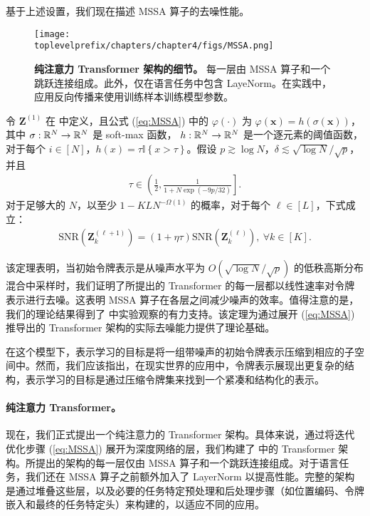 \documentclass[../../book-main_zh.tex]{subfiles}
\begin{document}
基于上述设置，我们现在描述 MSSA 算子的去噪性能。

\begin{figure*}[t]
\begin{center}
        \texttt{[image: \\toplevelprefix/chapters/chapter4/figs/MSSA.png]}
    \caption{\textbf{纯注意力 Transformer 架构的细节。} 每一层由 MSSA 算子和一个跳跃连接组成。此外，仅在语言任务中包含 LayeNorm。在实践中，应用反向传播来使用训练样本训练模型参数。 %
    }\label{fig:transformer}
\end{center}
\end{figure*}

\begin{theorem}\label{thm:1}
令 $\bm Z^{(1)}$ 在  中定义，且公式 (\ref{eq:MSSA}) 中的 $\varphi(\cdot)$ 为
$\varphi(\bm x) = h\left(\sigma(\bm x)\right)$，
其中 $\sigma:\mathbb{R}^N \to \mathbb{R}^N$ 是 soft-max 函数， $h:\mathbb{R}^N \to \mathbb{R}^N$ 是一个逐元素的阈值函数，对于每个 $i \in [N]$，$h(x) = \tau \mathbb{I}\left\{x > \tau\right\}$。假设 $p \gtrsim \log N$，$\delta \lesssim \sqrt{\log N}/\sqrt{p}$，并且
\begin{align*}
\tau \in \left( \frac{1}{2},  \frac{1}{1+N\exp(-9p/32)} \right].
\end{align*}
对于足够大的 $N$，以至少 $1-KLN^{-\Omega(1)}$ 的概率，对于每个 $\ell \in [L]$，下式成立：
    \begin{align}\label{eq:SNR}
        \mathrm{SNR}(\bm Z_k^{(\ell+1)}) = (1+\eta\tau) \mathrm{SNR}(\bm Z_k^{(\ell)}),\ \forall k \in [K].
    \end{align}
\end{theorem}
该定理表明，当初始令牌表示是从噪声水平为 $O(\sqrt{\log N}/\sqrt{p})$ 的低秩高斯分布混合中采样时，我们证明了所提出的 Transformer 的每一层都以线性速率对令牌表示进行去噪。这表明 MSSA 算子在各层之间减少噪声的效率。值得注意的是，我们的理论结果得到了  中实验观察的有力支持。该定理为通过展开 (\ref{eq:MSSA}) 推导出的 Transformer 架构的实际去噪能力提供了理论基础。

\begin{remark}
    在这个模型下，表示学习的目标是将一组带噪声的初始令牌表示压缩到相应的子空间中。然而，我们应该指出，在现实世界的应用中，令牌表示展现出更复杂的结构，表示学习的目标是通过压缩令牌集来找到一个紧凑和结构化的表示。
\end{remark}


\paragraph{纯注意力 Transformer。} 现在，我们正式提出一个纯注意力的 Transformer 架构。具体来说，通过将迭代优化步骤 (\ref{eq:MSSA}) 展开为深度网络的层，我们构建了  中的 Transformer 架构。所提出的架构的每一层仅由 MSSA 算子和一个跳跃连接组成。对于语言任务，我们还在 MSSA 算子之前额外加入了 LayerNorm 以提高性能。完整的架构是通过堆叠这些层，以及必要的任务特定预处理和后处理步骤（如位置编码、令牌嵌入和最终的任务特定头）来构建的，以适应不同的应用。
\end{document}
